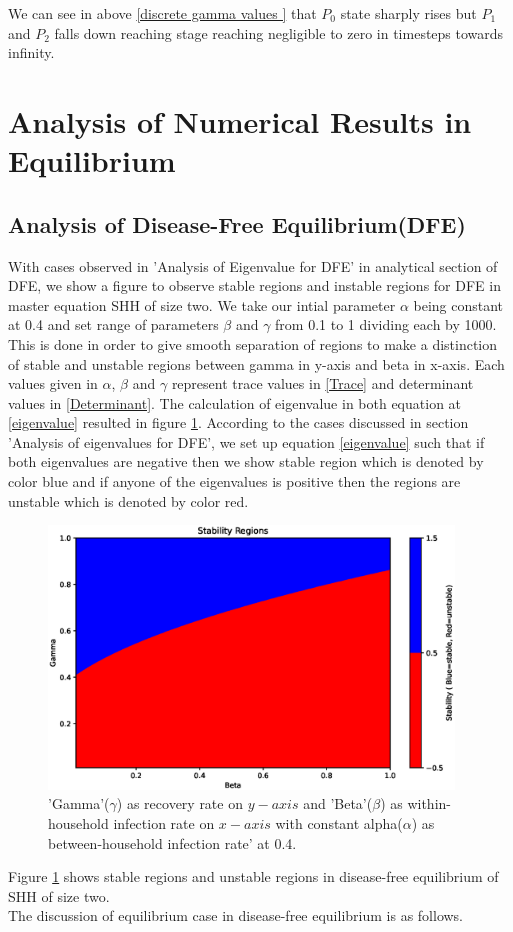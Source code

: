 \documentclass[paper=a4, fontsize=11pt, twoside, BCOR=12mm, parskip=full, listof=totoc]{scrreprt}
\begin{document}
{We can see in above \ref{discrete gamma values } that $P_0$ state sharply rises but $P_1$ and $P_2$ falls down reaching stage reaching negligible to zero in timesteps towards infinity.

\section{Analysis of Numerical Results in Equilibrium }
\subsection{Analysis of Disease-Free Equilibrium(DFE)}
With cases observed in 'Analysis of Eigenvalue for DFE' in analytical section of DFE, we show a figure to observe stable regions and instable regions for DFE in master equation SHH of size two. We take our intial parameter $\alpha$ being constant at 0.4 and set range of parameters $\beta$ and $\gamma$ from 0.1 to 1 dividing each by 1000. This is done in order to give smooth separation of regions to make a distinction of stable and unstable regions between gamma in y-axis and beta in x-axis. Each values given in $\alpha$, $\beta$ and $\gamma$ represent trace values in \ref{Trace} and determinant values in \ref{Determinant}. The calculation of eigenvalue in both equation at \ref{eigenvalue} resulted in figure \ref{regions of stability and unstability}. According to the cases discussed in section 'Analysis of eigenvalues for DFE', we set up equation  \ref{eigenvalue} such that if both eigenvalues are negative then we show stable region which is denoted by color blue and if anyone of the eigenvalues is positive then the regions are unstable which is denoted by color red.

\begin{figure}[H]
  \centering
  \includegraphics[height=7cm]{graph/stability.eps}
  \caption{'Gamma'($\gamma$) as recovery rate on $y-axis$ and 'Beta'($\beta$) as within-household infection rate on $x-axis$ with constant alpha($\alpha$) as between-household infection rate' at 0.4.}
  \label{regions of stability and unstability}
\end{figure}
Figure \ref{regions of stability and unstability} shows stable regions and unstable regions in disease-free equilibrium of SHH of size two.\\ 
The discussion of equilibrium case in disease-free equilibrium is as follows. 
}
\end{document}
